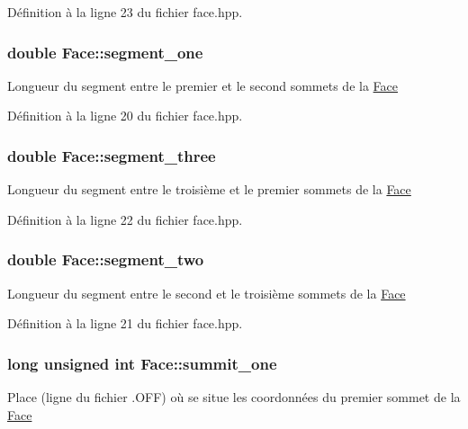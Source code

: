 Définition à la ligne 23 du fichier face.\-hpp.

\hypertarget{class_face_ae4053947c53549d2fd5cf43aa9c712f4}{
\subsubsection[{segment\-\_\-one}]{\setlength{\rightskip}{0pt plus 5cm}double Face\-::segment\-\_\-one\hspace{0.3cm}{\ttfamily [private]}}}\label{class_face_ae4053947c53549d2fd5cf43aa9c712f4}
Longueur du segment entre le premier et le second sommets de la \hyperlink{class_face}{Face} 

Définition à la ligne 20 du fichier face.\-hpp.

\hypertarget{class_face_a777ca579978d8d20c6e8a5e64a6999cc}{
\subsubsection[{segment\-\_\-three}]{\setlength{\rightskip}{0pt plus 5cm}double Face\-::segment\-\_\-three\hspace{0.3cm}{\ttfamily [private]}}}\label{class_face_a777ca579978d8d20c6e8a5e64a6999cc}
Longueur du segment entre le troisième et le premier sommets de la \hyperlink{class_face}{Face} 

Définition à la ligne 22 du fichier face.\-hpp.

\hypertarget{class_face_ae79107e53090d0a7efb5070ea093a70e}{
\subsubsection[{segment\-\_\-two}]{\setlength{\rightskip}{0pt plus 5cm}double Face\-::segment\-\_\-two\hspace{0.3cm}{\ttfamily [private]}}}\label{class_face_ae79107e53090d0a7efb5070ea093a70e}
Longueur du segment entre le second et le troisième sommets de la \hyperlink{class_face}{Face} 

Définition à la ligne 21 du fichier face.\-hpp.

\hypertarget{class_face_acaf2b92e18061912a39faabc94a8f4b6}{
\subsubsection[{summit\-\_\-one}]{\setlength{\rightskip}{0pt plus 5cm}long unsigned int Face\-::summit\-\_\-one\hspace{0.3cm}{\ttfamily [private]}}}\label{class_face_acaf2b92e18061912a39faabc94a8f4b6}
Place (ligne du fichier .O\-F\-F) où se situe les coordonnées du premier sommet de la \hyperlink{class_face}{Face} 

